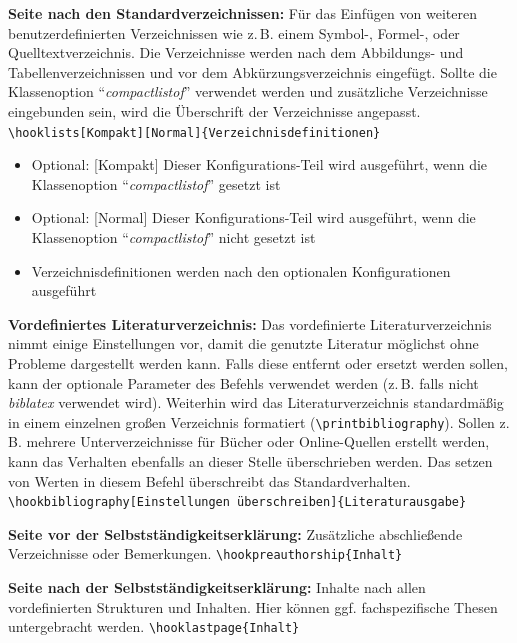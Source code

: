 	\textbf{Seite nach den Standardverzeichnissen:}\label{cmd:hooklists}
	Für das Einfügen von weiteren benutzerdefinierten Verzeichnissen wie z.\,B. einem Symbol-, Formel-, oder Quelltextverzeichnis.
	Die Verzeichnisse werden nach dem Abbildungs- und Tabellenverzeichnissen und vor dem Abkürzungsverzeichnis eingefügt.
	Sollte die Klassenoption \enquote{\textit{compactlistof}} verwendet werden und zusätzliche Verzeichnisse eingebunden sein, wird die Überschrift der Verzeichnisse angepasst.
	\newline
	\verb|\hooklists[Kompakt][Normal]{Verzeichnisdefinitionen}|
	\begin{itemize}
		\item Optional: [Kompakt] Dieser Konfigurations-Teil wird ausgeführt, wenn die Klassenoption \enquote{\textit{compactlistof}} gesetzt ist
		\item Optional: [Normal] Dieser Konfigurations-Teil wird ausgeführt, wenn die Klassenoption \enquote{\textit{compactlistof}} nicht gesetzt ist
		\item Verzeichnisdefinitionen werden nach den optionalen Konfigurationen ausgeführt
	\end{itemize}
	
	\textbf{Vordefiniertes Literaturverzeichnis:}\label{cmd:hookbibliography}
	Das vordefinierte Literaturverzeichnis nimmt einige Einstellungen vor, damit die genutzte Literatur möglichst ohne Probleme dargestellt werden kann.
	Falls diese entfernt oder ersetzt werden sollen, kann der optionale Parameter des Befehls verwendet werden (z.\,B. falls nicht \textit{biblatex} verwendet wird).
	Weiterhin wird das Literaturverzeichnis standardmäßig in einem einzelnen großen Verzeichnis formatiert (\verb|\printbibliography|).
	Sollen z.\,B. mehrere Unterverzeichnisse für Bücher oder Online-Quellen erstellt werden, kann das Verhalten ebenfalls an dieser Stelle überschrieben werden.
	Das setzen von Werten in diesem Befehl überschreibt das Standardverhalten.
	\newline
	\verb|\hookbibliography[Einstellungen überschreiben]{Literaturausgabe}|
	
	\textbf{Seite vor der Selbstständigkeitserklärung:}\label{cmd:hookpreauthorship}
	Zusätzliche abschließende Verzeichnisse oder Bemerkungen.
	\newline
	\verb|\hookpreauthorship{Inhalt}|
	
	\textbf{Seite nach der Selbstständigkeitserklärung:}\label{cmd:hooklastpage}
	Inhalte nach allen vordefinierten Strukturen und Inhalten.
	Hier können ggf. fachspezifische Thesen untergebracht werden.
	\newline
	\verb|\hooklastpage{Inhalt}|
	
